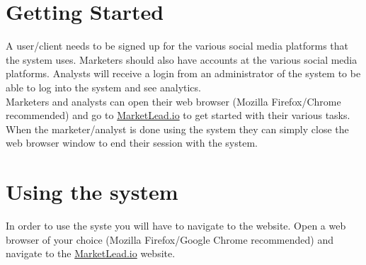 \documentclass{article}
\begin{document}
	\section{Getting Started}
		A user/client needs to be signed up for the various social media platforms that the system uses.
		Marketers should also have accounts at the various social media platforms.
		Analysts will receive a login from an administrator of the system to be able to log into the system and see analytics.\\
		Marketers and analysts can open their web browser (Mozilla Firefox/Chrome recommended) and go to \href{https://insuranceprofiling.herokuapp.com}{MarketLead.io} to get started with their various tasks.
		When the marketer/analyst is done using the system they can simply close the web browser window to end their session with the system.

	\section{Using the system}
		In order to use the syste you will have to navigate to the website.
		Open a web browser of your choice (Mozilla Firefox/Google Chrome recommended) and navigate to the \href{https://insuranceprofiling.herokuapp.com}{MarketLead.io} website.
\end{document}
